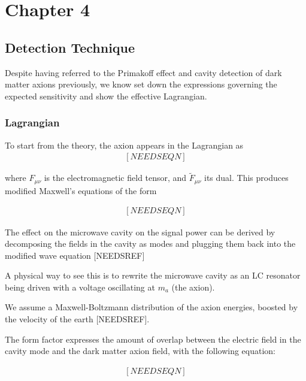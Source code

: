 \documentclass[11pt]{book}
\begin{document}
\chapter{Chapter 4}
\section{Detection Technique}

Despite having referred to the Primakoff effect and cavity detection of dark matter axions previously, we know set down the expressions governing the expected sensitivity and show the effective Lagrangian.

\subsection{Lagrangian}

To start from the theory, the axion appears in the Lagrangian as 
\begin{eqnarray}

[NEEDSEQN]

\end{eqnarray}

where $F_{\mu\nu}$ is the electromagnetic field tensor, and $\tilde F_{\mu\nu}$ its dual. This produces modified Maxwell's equations of the form

\begin{eqnarray}

[NEEDSEQN]

\end{eqnarray}

The effect on the microwave cavity on the signal power can be derived by decomposing the fields in the cavity as modes and plugging them back into the modified wave equation [NEEDSREF]

A physical way to see this is to rewrite the microwave cavity as an LC resonator being driven with a voltage oscillating at $m_a$ (the axion).

We assume a Maxwell-Boltzmann distribution of the axion energies, boosted by the velocity of the earth [NEEDSREF].

The form factor expresses the amount of overlap between the electric field in the cavity mode and the dark matter axion field, with the following equation:

\begin{eqnarray}

[NEEDSEQN]

\end{eqnarray}
\end{document}
